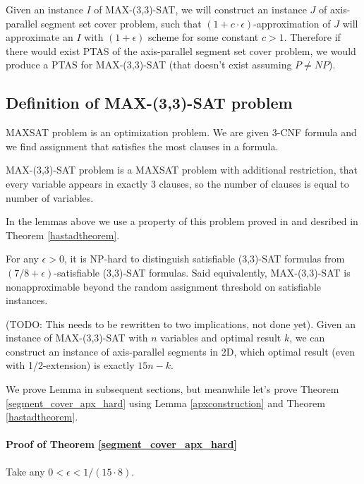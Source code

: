 Given an instance $I$ of MAX-(3,3)-SAT,
we will construct an instance $J$ of 
axis-parallel segment set cover problem,
such that $(1+c\cdot\epsilon)$-approximation of $J$ will approximate
an $I$ with $(1+\epsilon)$ scheme for some constant $c > 1$.
Therefore if there would exist PTAS of
the axis-parallel segment set cover problem,
we would produce a PTAS for MAX-(3,3)-SAT
(that doesn't exist assuming $P\neq NP$).


\subsection{Definition of  MAX-(3,3)-SAT problem}
MAXSAT problem is an optimization problem. We are given 3-CNF
formula and we find assignment that satisfies the most
clauses in a formula.

MAX-(3,3)-SAT problem is a MAXSAT problem with additional
restriction, that every variable appears in exactly 3 clauses,
so the number of clauses is equal to number of variables.

In the lemmas above we use
a property of this problem proved in \cite{hastad} and desribed in
Theorem \ref{hastadtheorem}.

\begin{tw}{
	\label{hastadtheorem}
	\textbf{\cite{hastad}}
	
	For any $\epsilon > 0$, it is NP-hard to distinguish satisfiable
	(3,3)-SAT formulas from
	\linebreak\mbox{$(7/8 + \epsilon)$-satisfiable}
	(3,3)-SAT formulas. Said equivalently, MAX-(3,3)-SAT
	is nonapproximable beyond the random assignment threshold
	on satisfiable instances.
}\end{tw}

\begin{lemma}{
	\label{apxconstruction}
	(TODO: This needs to be rewritten to two implications, not done yet).
	Given an instance of  MAX-(3,3)-SAT 
	with $n$ variables and optimal result $k$,
	we can construct an instance of axis-parallel segments in 2D,
	which optimal result (even with 1/2-extension) is exactly $15n - k$.
}\end{lemma}

We prove Lemma\label{apxconstruction} in
subsequent sections, but meanwhile let's prove
Theorem \ref{segment_cover_apx_hard} using Lemma \ref{apxconstruction}
and Theorem \ref{hastadtheorem}.

\paragraph{Proof of Theorem \ref{segment_cover_apx_hard}}
Take any $0 < \epsilon < 1/(15 \cdot 8)$.

